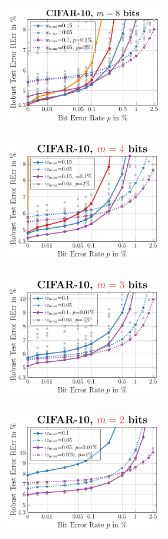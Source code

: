\begin{figure}[t]
	\centering
	\vspace*{-0.1cm}
	\begin{subfigure}{0.26\textwidth}
		\includegraphics[height=3.075cm]{c10_summary_8bit.pdf}
	\end{subfigure}
	\begin{subfigure}{0.24\textwidth}
		\includegraphics[height=3.1cm]{c10_summary_4bit.pdf}
	\end{subfigure}
	\begin{subfigure}{0.24\textwidth}
		\includegraphics[height=3.1cm]{c10_summary_3bit.pdf}
	\end{subfigure}
	\begin{subfigure}{0.24\textwidth}
		\includegraphics[height=3.1cm]{c10_summary_2bit.pdf}
	\end{subfigure}
	\\[2px]
	

\end{figure}
